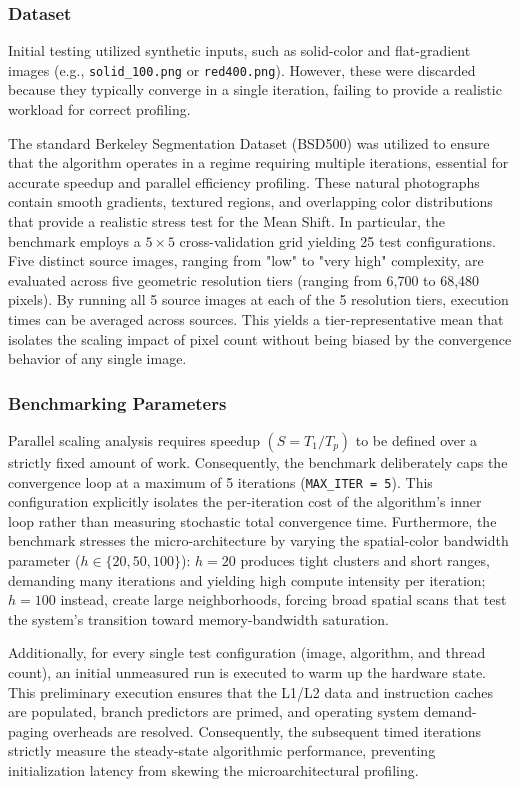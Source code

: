 \documentclass[10pt,twocolumn,letterpaper]{article}
\begin{document}
\subsubsection{Dataset}
Initial testing utilized synthetic inputs, such as solid-color and flat-gradient images (e.g., \texttt{solid\_100.png} or \texttt{red400.png}). However, these were discarded because they typically converge in a single iteration, failing to provide a realistic workload for correct profiling.

The standard Berkeley Segmentation Dataset (BSD500) was utilized to ensure that the algorithm operates in a regime requiring multiple iterations, essential for accurate speedup and parallel efficiency profiling. These natural photographs contain smooth gradients, textured regions, and overlapping color distributions that provide a realistic stress test for the Mean Shift\cite{first_mean_shift}. In particular, the benchmark employs a $5 \times 5$ cross-validation grid yielding 25 test configurations. Five distinct source images, ranging from "low" to "very high" complexity, are evaluated across five geometric resolution tiers (ranging from 6,700 to 68,480 pixels). By running all 5 source images at each of the 5 resolution tiers, execution times can be averaged across sources. This yields a tier-representative mean that isolates the scaling impact of pixel count without being biased by the convergence behavior of any single image.

\subsubsection{Benchmarking Parameters}
Parallel scaling analysis requires speedup $(S = T_1 / T_p)$ to be defined over a strictly fixed amount of work. Consequently, the benchmark deliberately caps the convergence loop at a maximum of 5 iterations (\texttt{MAX\_ITER = 5}). This configuration explicitly isolates the per-iteration cost of the algorithm's inner loop rather than measuring stochastic total convergence time. Furthermore, the benchmark stresses the micro-architecture by varying the spatial-color bandwidth parameter ($h \in \{20, 50, 100\}$): $h = 20$ produces tight clusters and short ranges, demanding many iterations and yielding high compute intensity per iteration; $h = 100$ instead, create large neighborhoods, forcing broad spatial scans that test the system's transition toward memory-bandwidth saturation.


Additionally, for every single test configuration (image, algorithm, and thread count), an initial unmeasured run is executed to warm up the hardware state. This preliminary execution ensures that the L1/L2 data and instruction caches are populated, branch predictors are primed, and operating system demand-paging overheads are resolved. Consequently, the subsequent timed iterations strictly measure the steady-state algorithmic performance, preventing initialization latency from skewing the microarchitectural profiling.
\end{document}
